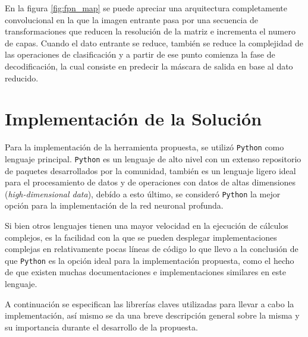 En la figura \ref{fig:fpn_map} se puede apreciar una arquitectura completamente convolucional en la que la imagen entrante pasa por una secuencia de transformaciones que reducen la resolución de la matriz e incrementa el numero de capas. Cuando el dato entrante se reduce, también se reduce la complejidad de las operaciones de clasificación y a partir de ese punto comienza la fase de decodificación, la cual consiste en predecir la máscara de salida en base al dato reducido.

\section{Implementación de la Solución}
Para la implementación de la herramienta propuesta, se utilizó \texttt{Python} como lenguaje principal. \texttt{Python} es un lenguaje de alto nivel con un extenso repositorio de paquetes desarrollados por la comunidad, también es un lenguaje ligero ideal para el procesamiento de datos y de operaciones con datos de altas dimensiones (\emph{high-dimensional data}), debído a esto último, se consideró \texttt{Python} la mejor opción para la implementación de la red neuronal profunda.

Si bien otros lenguajes tienen una mayor velocidad en la ejecución de cálculos complejos, es la facilidad con la que se pueden desplegar implementaciones complejas en relativamente pocas líneas de código lo que llevo a la conclusión de que \texttt{Python} es la opción ideal para la implementación propuesta, como el hecho de que existen muchas documentaciones e implementaciones similares en este lenguaje.

A continuación se especifican las librerías claves utilizadas para llevar a cabo la implementación, así mismo se da una breve descripción general sobre la misma y su importancia durante el desarrollo de la propuesta.

